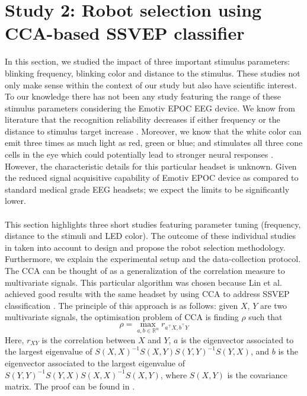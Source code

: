 \documentclass{svmult}
\begin{document}
\section{Study 2: Robot selection using CCA-based SSVEP classifier}
\label{sec:CCA_approach}
In this section, we studied the impact of three important stimulus parameters: blinking frequency, blinking color and distance to the stimulus. These studies not only make sense within the context of our study but also have scientific interest. To our knowledge there has not been any study featuring the range of these stimulus parameters considering the Emotiv EPOC EEG device. We know from literature that the recognition reliability decreases if either frequency or the distance to stimulus target increase \cite{herrmann2001, wu2013effect}. Moreover, we know that the white color can emit three times as much light as red, green or blue; and stimulates all three cone cells in the eye which could potentially lead to stronger neural responses \cite{aljshamee2016discriminate}. However, the characteristic details for this particular headset is unknown. Given the reduced signal acquisitive capability of Emotiv EPOC device as compared to standard medical grade EEG headsets; we expect the limits to be significantly lower.\\
\\
This section highlights three short studies featuring parameter tuning (frequency, distance to the stimuli and LED color). The outcome of these individual studies in taken into account to design and propose the robot selection methodology. Furthermore, we explain the experimental setup and the data-collection protocol. The CCA can be thought of as a generalization of the correlation measure to multivariate signals. This particular algorithm was chosen because Lin et al. achieved good results with the same headset by using CCA to address SSVEP classification \cite{Lin2014}. The principle of this approach is as follows: given $X$, $Y$ are two multivariate signals, the optimisation problem of CCA is finding $\rho$ such that
\\
\begin{equation}
\label{rho}
\rho = \max_{a, b \in \mathbb R^n}  r_{ a^\top X, b^\top Y}
\end{equation}
Here,  $r_{XY}$ is the correlation between $X$ and $Y$,  $a$ is the eigenvector associated to the largest eigenvalue of $S(X, X)^{-1} S(X,Y) S(Y, Y)^{-1} S(Y, X)$, and $b$ is the eigenvector associated to the largest eigenvalue of $S(Y, Y)^{-1} S(Y, X) S(X, X)^{-1} S(X, Y)$, where $S(X, Y)$ is the covariance matrix. The proof  can be found in \cite{rencher2003}.
\end{document}
